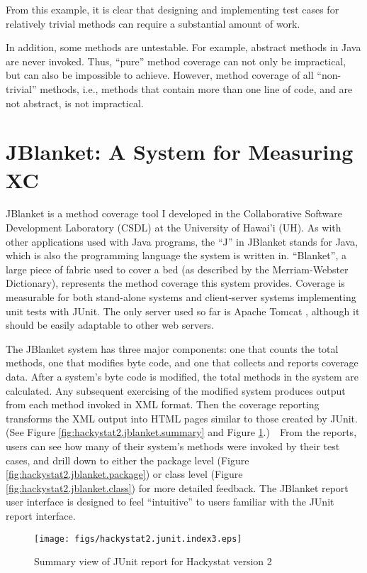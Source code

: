 From this example, it is clear that designing and implementing test cases
for relatively trivial methods can require a substantial amount of work.

In addition, some methods are untestable.  For example, abstract methods in
Java are never invoked.  Thus, ``pure'' method coverage can not only be
impractical, but can also be impossible to achieve.  However, method
coverage of all ``non-trivial'' methods, i.e., methods that contain more
than one line of code, and are not abstract, is not impractical.

\section{JBlanket: A System for Measuring XC}
JBlanket \cite{JBlanket} is a method coverage tool I developed in the
Collaborative Software Development Laboratory (CSDL) at the University of
Hawai'i (UH).  As with other applications used with Java programs, the
``J'' in JBlanket stands for Java, which is also the programming language
the system is written in.  ``Blanket'', a large piece of fabric used to
cover a bed (as described by the Merriam-Webster Dictionary), represents
the method coverage this system provides.  Coverage is measurable for both
stand-alone systems and client-server systems implementing unit tests with
JUnit.  The only server used so far is Apache Tomcat \cite{Tomcat},
although it should be easily adaptable to other web servers.

The JBlanket system has three major components: one that counts the total
methods, one that modifies byte code, and one that collects and reports
coverage data.  After a system's byte code is modified, the total methods
in the system are calculated.  Any subsequent exercising of the modified
system produces output from each method invoked in XML format.  Then the
coverage reporting transforms the XML output into HTML pages similar to
those created by JUnit.  (See Figure \ref{fig:hackystat2.jblanket.summary}
and Figure \ref{fig:hackystat2.junit.index}.)~~From the reports, users can
see how many of their system's methods were invoked by their test cases,
and drill down to either the package level (Figure
\ref{fig:hackystat2.jblanket.package}) or class level (Figure
\ref{fig:hackystat2.jblanket.class}) for more detailed feedback.  The
JBlanket report user interface is designed to feel ``intuitive'' to users
familiar with the JUnit report interface.

\begin{figure}[htbp]
  \centering
  \texttt{[image: figs/hackystat2.junit.index3.eps]}
  \caption{Summary view of JUnit report for Hackystat version 2}
  \label{fig:hackystat2.junit.index}
\end{figure}

